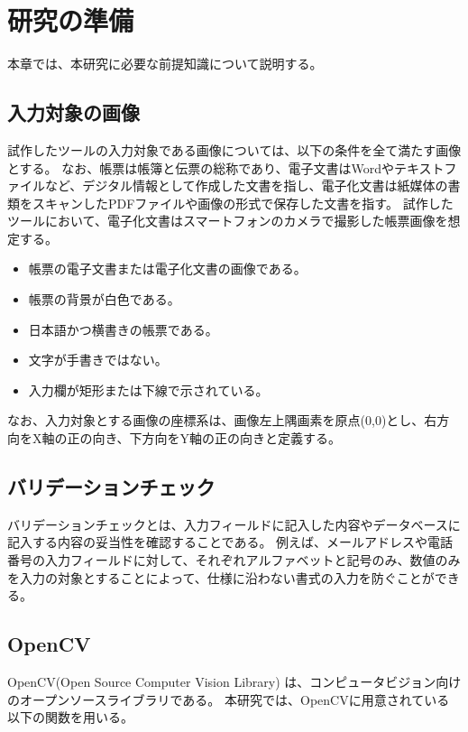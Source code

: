 \chapter{研究の準備}\label{cha:Preparation}
本章では、本研究に必要な前提知識について説明する。

\section{入力対象の画像}\label{sec:input_images}
試作したツールの入力対象である画像については、以下の条件を全て満たす画像とする。
なお、帳票は帳簿と伝票の総称であり、電子文書はWordやテキストファイルなど、デジタル情報として作成した文書を指し、電子化文書は紙媒体の書類をスキャンしたPDFファイルや画像の形式で保存した文書を指す\cite{電子文書と電子化文書}。
試作したツールにおいて、電子化文書はスマートフォンのカメラで撮影した帳票画像を想定する。

\begin{itemize}
	\item 帳票の電子文書または電子化文書の画像である。
	\item 帳票の背景が白色である。
	\item 日本語かつ横書きの帳票である。
	\item 文字が手書きではない。
	\item 入力欄が矩形または下線で示されている。
\end{itemize}

なお、入力対象とする画像の座標系は、画像左上隅画素を原点(0,0)とし、右方向をX軸の正の向き、下方向をY軸の正の向きと定義する。

\section{バリデーションチェック}\label{sec:validation_check}
バリデーションチェックとは、入力フィールドに記入した内容やデータベースに記入する内容の妥当性を確認することである\cite{バリデーションチェック}。
例えば、メールアドレスや電話番号の入力フィールドに対して、それぞれアルファベットと記号のみ、数値のみを入力の対象とすることによって、仕様に沿わない書式の入力を防ぐことができる。

\section{OpenCV}\label{sec:OpenCV}
OpenCV(Open Source Computer Vision Library) は、コンピュータビジョン向けのオープンソースライブラリである\cite{OpenCV}。
本研究では、OpenCVに用意されている以下の関数を用いる。

